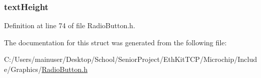 \hypertarget{struct_r_a_d_i_o_b_u_t_t_o_n_a40fa9c35391b0005032180b85e7afd34}{}
\subsubsection[{text\+Height}]{ text\+Height}\label{struct_r_a_d_i_o_b_u_t_t_o_n_a40fa9c35391b0005032180b85e7afd34}


Definition at line 74 of file Radio\+Button.\+h.



The documentation for this struct was generated from the following file\+:\begin{DoxyCompactItemize}
\item 
C\+:/\+Users/mainuser/\+Desktop/\+School/\+Senior\+Project/\+Eth\+Kit\+T\+C\+P/\+Microchip/\+Include/\+Graphics/\hyperlink{_radio_button_8h}{Radio\+Button.\+h}\end{DoxyCompactItemize}
